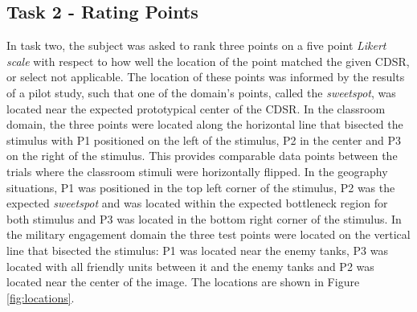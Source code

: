 \documentclass[11pt,letterpaper]{article}
\begin{document}
\subsection{Task 2 - Rating Points} 
In task two, the subject was asked to rank three points on a five point \textit{Likert scale} with respect to how well the location of the point matched the given CDSR, or select not applicable.  The location of these points was informed by the results of a pilot study, such that one of the domain's points, called the \textit{sweetspot}, was located near the expected prototypical center of the CDSR. In the classroom domain, the three points were located along the horizontal line that bisected the stimulus with P1 positioned on the left of the stimulus, P2 in the center and P3 on the right of the stimulus.  This provides comparable data points between the trials where the classroom stimuli were horizontally flipped.  In the geography situations, P1 was positioned in the top left corner of the stimulus, P2 was the expected \textit{sweetspot} and was located within the expected bottleneck region for both stimulus and P3 was located in the bottom right corner of the stimulus.  In the military engagement domain the three test points were located on the vertical line that bisected the stimulus: P1 was located near the enemy tanks, P3 was located with all friendly units between it and the enemy tanks and P2 was located near the center of the image.  The locations are shown in Figure \ref{fig:locations}.
\end{document}
